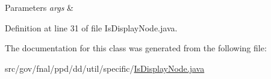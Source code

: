 \begin{DoxyParams}{Parameters}
{\em args} & \\
\hline
\end{DoxyParams}


Definition at line 31 of file Is\-Display\-Node.\-java.



The documentation for this class was generated from the following file\-:\begin{DoxyCompactItemize}
\item 
src/gov/fnal/ppd/dd/util/specific/\hyperlink{IsDisplayNode_8java}{Is\-Display\-Node.\-java}\end{DoxyCompactItemize}
